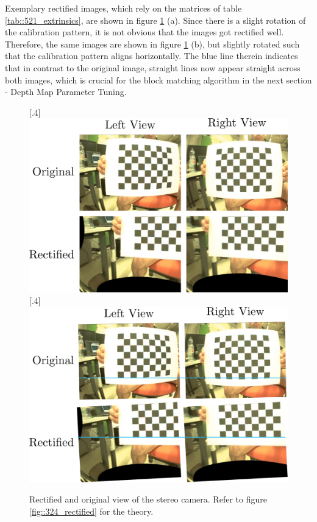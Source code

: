 Exemplary rectified images, which rely on the matrices of table \ref{tab::521_extrinsics}, are shown in figure \ref{fig::521_rect} (a). Since there is a slight rotation of the calibration pattern, it is not obvious that the images got rectified well. Therefore, the same images are shown in figure \ref{fig::521_rect} (b), but slightly rotated such that the calibration pattern aligns horizontally. The blue line therein indicates that in contrast to the original image, straight lines now appear straight across both images, which is crucial for the block matching algorithm in the next section - Depth Map Parameter Tuning.
\begin{figure}[h]
	\centering
	[.4\linewidth]{\includegraphics[scale=.25]{chapters/05_experiments/02_autonomous_walking/01_camera_calibration/rect.png}}
	[.4\linewidth]{\includegraphics[scale=.25]{chapters/05_experiments/02_autonomous_walking/01_camera_calibration/rect_line.png}}
	\caption{Rectified and original view of the stereo camera. Refer to figure \ref{fig::324_rectified} for the theory.}
	\label{fig::521_rect}
\end{figure}
